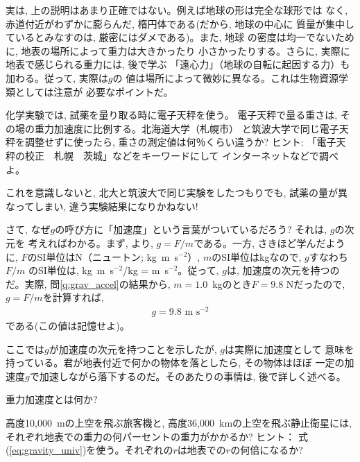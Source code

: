 実は, 上の説明はあまり正確ではない。例えば地球の形は完全な球形では
なく, 赤道付近がわずかに膨らんだ, 楕円体である(だから, 地球の中心に
質量が集中しているとみなすのは, 厳密にはダメである)。また, 地球
の密度は均一でないために, 地表の場所によって重力は大きかったり
小さかったりする。さらに, 実際に地表で感じられる重力には, 後で学ぶ
「遠心力」（地球の自転に起因する力）も加わる。従って, 実際は$g$の
値は場所によって微妙に異なる。これは生物資源学類としては注意が
必要なポイントだ。

\begin{q}\label{q:weight_calib} 化学実験では, 
試薬を量り取る時に電子天秤を使う。
電子天秤で量る重さは, その場の重力加速度に比例する。北海道大学（札幌市）
と筑波大学で同じ電子天秤を調整せずに使ったら, 重さの測定値は何％くらい違うか?
ヒント: 「電子天秤の校正　札幌　茨城」などをキーワードにして
インターネットなどで調べよ。\end{q}

これを意識しないと, 北大と筑波大で同じ実験をしたつもりでも, 
試薬の量が異なってしまい, 違う実験結果になりかねない!\mv

さて, なぜ$g$の呼び方に「加速度」という言葉がついているだろう? それは, $g$の次元を
考えればわかる。まず, より, $g=F/m$である。一方, 
さきほど学んだように, 
$F$のSI単位はN（ニュートン; kg~m~s$^{-2}$）, $m$のSI単位はkgなので, $g$すなわち$F/m$
のSI単位は, kg~m~s$^{-2}$/kg = m~s$^{-2}$。従って, $g$は, 
加速度の次元を持つのだ。実際, 問\ref{q:grav_accel}の結果から, 
$m=1.0$~kgのとき$F=9.8$ Nだったので, 
$g=F/m$を計算すれば, 
\begin{eqnarray}
g= 9.8\,\,\text{m~s$^{-2}$}
\end{eqnarray}
である(この値は記憶せよ)。

ここでは$g$が加速度の次元を持つことを示したが, $g$は実際に加速度として
意味を持っている。君が地表付近で何かの物体を落としたら, その物体はほぼ
一定の加速度$g$で加速しながら落下するのだ。そのあたりの事情は, 後で詳しく述べる。


\begin{q}\label{q:what_is_g}
重力加速度とは何か?
\end{q}
\mv

\begin{q}\label{q:geostat_sat}
高度10,000~mの上空を飛ぶ旅客機と, 高度36,000~kmの上空を飛ぶ静止衛星には, 
それぞれ地表での重力の何パーセントの重力がかかるか? ヒント：
式(\ref{eq:gravity_univ})を使う。それぞれの$r$は地表での$r$の何倍になるか?
\end{q}
\mv

